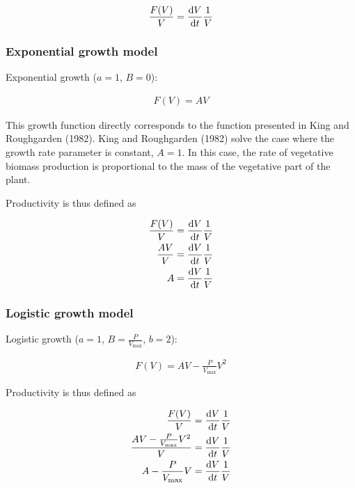 \documentclass[12pt, oneside]{article}   	%
\begin{document}
\begin{align}
\frac{F(V)}{V} = \dv{V}{t} \frac{1}{V} \nonumber 
\end{align}

\subsubsection{Exponential growth model}

\noindent Exponential growth ($a=1$, $B=0$):

\begin{align}
F(V) = AV
\end{align}

This growth function directly corresponds to the function presented in King and Roughgarden (1982). King and Roughgarden (1982) solve the case where the growth rate parameter is constant, $A=1$. In this case, the rate of vegetative biomass production is proportional to the mass of the vegetative part of the plant. 

Productivity is thus defined as

\begin{align}
\frac{F(V)}{V} & = \dv{V}{t} \frac{1}{V} \nonumber \\
\frac{AV}{V} & = \dv{V}{t} \frac{1}{V} \nonumber \\
A & = \dv{V}{t} \frac{1}{V} \nonumber \\
\end{align}

\subsubsection{Logistic growth model}

\noindent Logistic growth  ($a=1$, $B=\frac{P}{V_{\text{max}}}$, $b=2$):

\begin{align}
F(V) = AV - \frac{P}{V_{\text{max}}} V^2
\end{align}

Productivity is thus defined as

\begin{align}
\frac{F(V)}{V} & = \dv{V}{t} \frac{1}{V} \nonumber \\
\frac{AV - \frac{P}{V_{\text{max}}} V^2}{V} & = \dv{V}{t} \frac{1}{V} \nonumber \\
A - \frac{P}{V_{\text{max}}} V & = \dv{V}{t} \frac{1}{V} \nonumber \\
\end{align}
\end{document}

